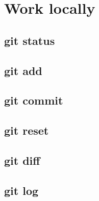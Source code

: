 \section{Work locally}
\begin{frame}[fragile]
    \slidetitle
\end{frame}

\subsection{git status}
\begin{frame}[fragile]
    \subslidetitle
\end{frame}

\subsection{git add}
\begin{frame}[fragile]
    \subslidetitle
\end{frame}

\subsection{git commit}
\begin{frame}[fragile]
    \subslidetitle
\end{frame}

\subsection{git reset}
\begin{frame}[fragile]
    \subslidetitle
\end{frame}

\subsection{git diff}
\begin{frame}[fragile]
    \subslidetitle
\end{frame}

\subsection{git log}
\begin{frame}[fragile]
    \subslidetitle
\end{frame}

